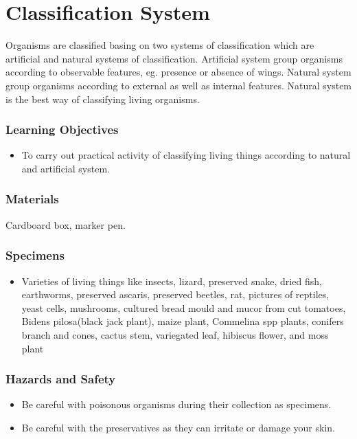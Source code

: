 \section{Classification System}
Organisms are classified basing on two systems of classification which are artificial and natural systems of classification. Artificial system group organisms according to observable features, eg. presence or absence of wings. Natural system group organisms according to external as well as internal features. Natural system is the best way of classifying living organisms.

\subsubsection*{Learning Objectives}
\begin{itemize}
\item{To carry out practical activity of classifying living things according to natural and artificial system.}
\end{itemize}

\subsubsection*{Materials}
Cardboard box, marker pen.

\subsubsection*{Specimens}
\begin{itemize}
\item{Varieties of living things like insects, lizard, preserved snake, dried fish, earthworms, preserved ascaris, preserved beetles, rat, pictures of reptiles, yeast cells, mushrooms, cultured bread mould and mucor from cut tomatoes, Bidens pilosa(black jack plant), maize plant, Commelina spp plants, conifers branch and cones, cactus stem, variegated leaf, hibiscus flower, and moss plant}
\end{itemize}

\subsubsection*{Hazards and Safety}
\begin{itemize}
\item{Be careful with poisonous organisms during their collection as  specimens.}
\item{Be careful with the preservatives as they can irritate or damage your skin.}
\end{itemize}

